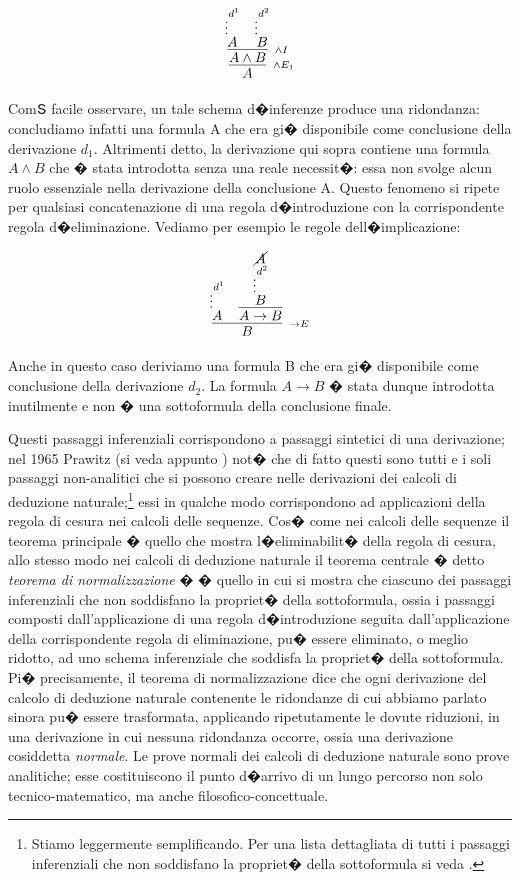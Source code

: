 \documentclass[a4paper,12pt]{aphex}
\begin{document}
$$\infer[_{\wedge E_{1}}]{A}{\infer[_{\wedge I}]{A\wedge B}{\deduce{A}{\vdots^{d^{1}}} & \deduce{B}{\vdots^{d^{2}}}}}$$

 
\noindent ComՏ facile osservare, un tale schema d�inferenze produce una ridondanza: concludiamo infatti una formula A che era gi� disponibile come conclusione della derivazione $d_{1}$. Altrimenti detto, la derivazione qui sopra contiene una formula $A\wedge B$ che � stata introdotta senza una reale necessit�: essa non svolge alcun ruolo essenziale nella derivazione della conclusione A. Questo fenomeno si ripete per qualsiasi concatenazione di una regola d�introduzione con la corrispondente regola d�eliminazione. Vediamo per esempio le regole dell�implicazione:


$$\infer[_{\rightarrow E}]{B}{\deduce{A}{\vdots^{d^{1}}} & \infer[]{A\rightarrow B}{\deduce{B}{\deduce{\vdots^{d^{2}}}{\cancel{A}}}}}$$


\noindent Anche in questo caso deriviamo una formula B che era gi� disponibile come conclusione della derivazione $d_{2}$. La formula $A\rightarrow B$ � stata dunque introdotta inutilmente e non � una sottoformula della conclusione finale. 

Questi passaggi inferenziali corrispondono a passaggi sintetici di una derivazione; nel 1965 Prawitz (si veda appunto \cite{prawitz2}) not� che di fatto questi sono tutti e i  soli passaggi non-analitici che si possono creare nelle derivazioni dei calcoli di deduzione naturale;\footnote{Stiamo leggermente semplificando.  Per una lista dettagliata di tutti i passaggi inferenziali che non soddisfano la propriet� della sottoformula si veda \cite{prawitz2}.} essi in qualche modo corrispondono ad applicazioni della regola di cesura nei calcoli delle sequenze.
Cos� come nei calcoli delle sequenze il teorema principale � quello che mostra l�eliminabilit� della regola di cesura, allo stesso modo nei calcoli di deduzione naturale il teorema centrale � detto \emph{teorema di normalizzazione} � � quello in cui si mostra che ciascuno dei passaggi inferenziali che non soddisfano la propriet� della sottoformula, ossia i passaggi composti dall'applicazione di una regola d�introduzione seguita dall'applicazione della corrispondente regola di eliminazione, pu� essere eliminato, o meglio ridotto, ad uno schema inferenziale che soddisfa la propriet� della sottoformula. Pi� precisamente, il teorema di normalizzazione dice che ogni derivazione del calcolo di deduzione naturale contenente le ridondanze di cui abbiamo parlato sinora pu� essere trasformata, applicando ripetutamente le dovute riduzioni, in una derivazione in cui nessuna ridondanza occorre, ossia una derivazione cosiddetta \emph{normale}. 
Le prove normali dei calcoli di deduzione naturale sono prove analitiche; esse costituiscono il punto d�arrivo di un lungo percorso non solo tecnico-matematico, ma anche filosofico-concettuale.
\end{document}
